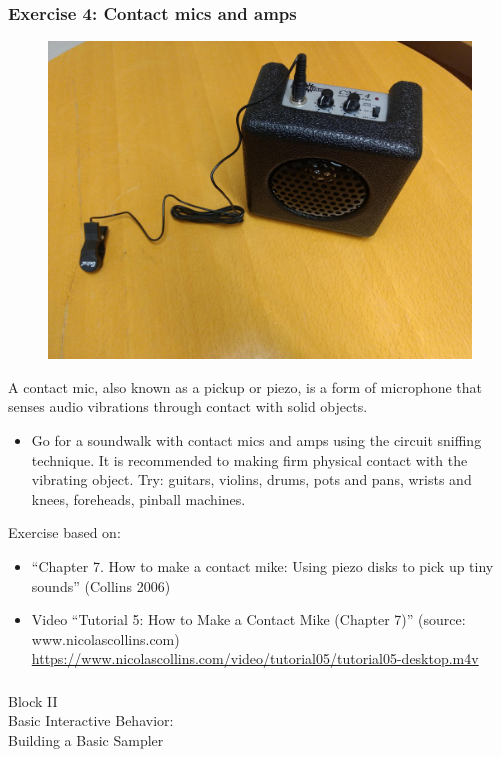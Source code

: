 \documentclass[screen, aspectratio=169]{beamer}
\begin{document}
\begin{frame}
  \frametitle{Exercise 4: Contact mics and amps}
 \begin{figure}
	\includegraphics[scale=0.05]{img/contactmics.jpg}
\end{figure}  

  {\scriptsize 
  A contact mic, also known as a pickup or piezo, is a form of microphone that senses audio vibrations through contact with solid objects.
  \begin{itemize}
    \item Go for a soundwalk with contact mics and amps using the circuit sniffing technique. It is recommended to making firm physical contact with the vibrating object. Try: guitars, violins, drums, pots and pans, wrists and knees, foreheads, pinball machines.     
  \end{itemize}
  }
  {\tiny Exercise based on:	  
    \begin{itemize}
	\item ``Chapter 7. How to make a contact mike: Using piezo disks to pick up tiny sounds'' (Collins 2006)
	\item Video ``Tutorial 5: How to Make a Contact Mike (Chapter 7)'' (source: www.nicolascollins.com)\\
	\url{https://www.nicolascollins.com/video/tutorial05/tutorial05-desktop.m4v}
    \end{itemize}
   } 
\end{frame}
%

\usebackgroundtemplate{}
\begin{frame}
\frametitle{}
{\huge Block II\\ Basic Interactive Behavior:\\ Building a Basic Sampler}
\end{frame}
\end{document}
